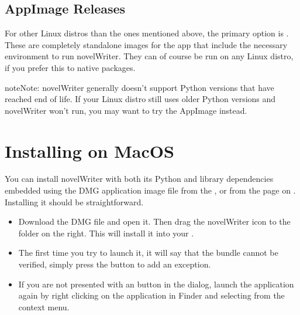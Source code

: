 \documentclass[a4paper,11pt,english]{sphinxmanual}
\begin{document}
\subsection{AppImage Releases}
\label{\detokenize{int_started:appimage-releases}}
\sphinxAtStartPar
For other Linux distros than the ones mentioned above, the primary option is . These are
completely standalone images for the app that include the necessary environment to run novelWriter.
They can of course be run on any Linux distro, if you prefer this to native packages.

\begin{sphinxadmonition}{note}{Note:}
\sphinxAtStartPar
novelWriter generally doesn’t support Python versions that have reached end of life. If your
Linux distro still uses older Python versions and novelWriter won’t run, you may want to try the
AppImage instead.
\end{sphinxadmonition}


\section{Installing on MacOS}
\label{\detokenize{int_started:installing-on-macos}}\label{\detokenize{int_started:a-started-macos}}
\sphinxAtStartPar
You can install novelWriter with both its Python and library dependencies embedded using the DMG
application image file from the , or from the  page on .
Installing it should be straightforward.
\begin{itemize}
\item {} 
\sphinxAtStartPar
Download the DMG file and open it. Then drag the novelWriter icon to the 
folder on the right. This will install it into your .

\item {} 
\sphinxAtStartPar
The first time you try to launch it, it will say that the bundle cannot be verified, simply press
the  button to add an exception.

\item {} 
\sphinxAtStartPar
If you are not presented with an  button in the dialog, launch the application
again by right clicking on the application in Finder and selecting  from the
context menu.

\end{itemize}
\end{document}
